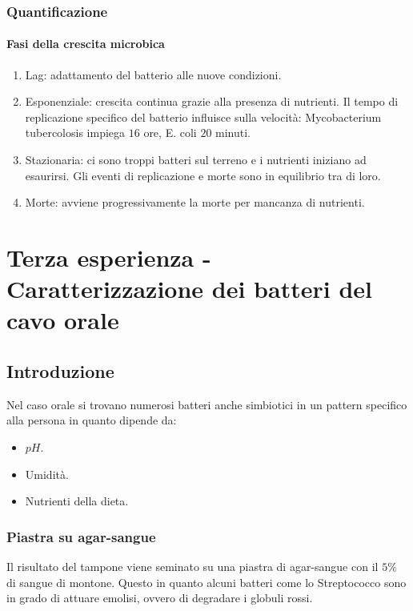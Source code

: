 		\subsubsection{Quantificazione}
	
			\paragraph{Fasi della crescita microbica}\mbox{}
			\begin{enumerate}
				\item Lag: adattamento del batterio alle nuove condizioni.
				\item Esponenziale: crescita continua grazie alla presenza di nutrienti.
					Il tempo di replicazione specifico del batterio influisce sulla velocit\`a: Mycobacterium tubercolosis impiega $16$ ore, E. coli $20$ minuti.
				\item Stazionaria: ci sono troppi batteri sul terreno e i nutrienti iniziano ad esaurirsi.
					Gli eventi di replicazione e morte sono in equilibrio tra di loro.
				\item Morte: avviene progressivamente la morte per mancanza di nutrienti.
			\end{enumerate}


\section{Terza esperienza - Caratterizzazione dei batteri del cavo orale}

	\subsection{Introduzione}
	Nel caso orale si trovano numerosi batteri anche simbiotici in un pattern specifico alla persona in quanto dipende da:
	\begin{multicols}{3}
		\begin{itemize}
			\item $pH$.
			\item Umidit\`a.
			\item Nutrienti della dieta.
		\end{itemize}
	\end{multicols}
	
		\subsubsection{Piastra su agar-sangue}
		Il risultato del tampone viene seminato su una piastra di agar-sangue con il $5\%$ di sangue di montone. 
		Questo in quanto alcuni batteri come lo Streptococco sono in grado di attuare emolisi, ovvero di degradare i globuli rossi.

